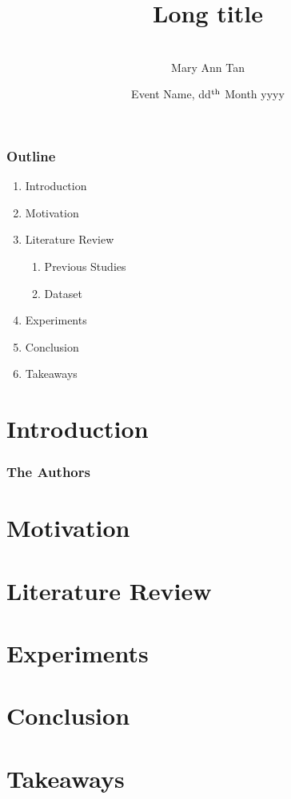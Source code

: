 \documentclass[xcolor,aspectratio=169,compress]{beamer}
\title[Short Title]{Long title}
\author[Author]{
\\[.8cm] %
Mary Ann Tan}
\institute[FIZ ISE-ML]{FIZ Karlsruhe -- Leibniz Institute for Information Infrastructure, Germany}
\date[Short Event, 18.02.2025]{Event Name, {\sansmath dd$^{\rm th}$} Month yyyy}
\begin{document}
\frame[plain]{\titlepage}

\begin{frame}
\frametitle{Outline}
    \begin{enumerate}
        \item Introduction
        \item Motivation
        \item Literature Review
        \begin{enumerate}
            \item Previous Studies
            \item Dataset
        \end{enumerate}
        \item Experiments
        \item Conclusion
        \item Takeaways
    \end{enumerate}
\end{frame}

\section{Introduction}

\begin{frame}
\frametitle{The Authors}
\end{frame}

\section{Motivation}
\section{Literature Review}
\section{Experiments}
\section{Conclusion}
\section{Takeaways}
\end{document}
